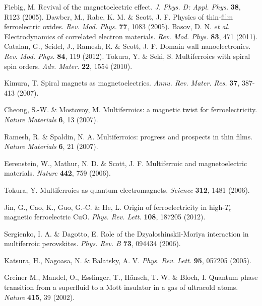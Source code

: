 \documentclass[a4paper,showpacs]{revtex4}
\begin{document}
\begin{thebibliography}{99}

 Fiebig, M. Revival of the magnetoelectric effect. \textit{J. Phys. D: Appl. Phys.} \textbf{38}, R123 (2005).
 Dawber, M., Rabe, K. M. $\&$ Scott, J. F. Physics of thin-film ferroelectric oxides. \textit{Rev. Mod. Phys.} \textbf{77}, 1083 (2005).
  Basov, D. N. \emph{et al.} Electrodynamics of correlated electron materials. \textit{Rev. Mod. Phys.} \textbf{83}, 471 (2011).
 Catalan, G., Seidel, J., Ramesh, R. $\&$ Scott, J. F. Domain wall nanoelectronics. \textit{Rev. Mod. Phys.} \textbf{84}, 119 (2012).
 Tokura, Y. $\&$ Seki, S. Multiferroics with spiral spin orders.  \textit{Adv. Mater.} \textbf{22}, 1554 (2010).

 Kimura, T. Spiral magnets as magnetoelectrics. \textit{Annu. Rev. Mater. Res.} \textbf{37}, 387-413 (2007).

 Cheong, S.-W. $\&$ Mostovoy, M. Multiferroics: a magnetic twist for ferroelectricity. \textit{Nature Materials} \textbf{6}, 13 (2007).

 Ramesh, R. $\&$ Spaldin, N. A. Multiferroics: progress and prospects in thin films. \textit{Nature Materials} \textbf{6}, 21 (2007).

 Eerenstein, W., Mathur, N. D. $\&$ Scott, J. F. Multiferroic and magnetoelectric materials. \textit{Nature} \textbf{442}, 759 (2006).

 Tokura, Y. Multiferroics as quantum electromagnets. \textit{Science} \textbf{312}, 1481 (2006).

 Jin, G., Cao, K., Guo, G.-C. $\&$ He, L. Origin of ferroelectricity in high-$T_c$ magnetic ferroelectric CuO. \textit{Phys. Rev. Lett.} \textbf{108}, 187205 (2012).

 Sergienko, I. A. $\&$ Dagotto, E. Role of the Dzyaloshinskii-Moriya interaction in multiferroic perovskites. \textit{Phys. Rev. B} \textbf{73}, 094434 (2006).

 Katsura, H., Nagoasa, N. $\&$ Balatsky, A. V. \textit{Phys. Rev. Lett.}
\textbf{95}, 057205 (2005).

 Greiner M., Mandel, O., Esslinger, T., H{\"a}nsch, T. W. $\&$ Bloch, I. Quantum phase transition from a superfluid to a Mott insulator in a gas of ultracold atoms. \textit{Nature} \textbf{415}, 39 (2002).


\end{thebibliography}
\end{document}
